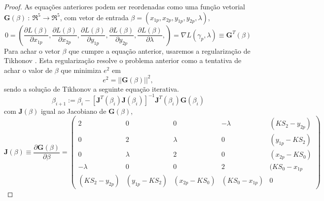 \documentclass[a4paper,10pt]{article}
\begin{document}
\begin{proof}
As equações anteriores podem ser reordenadas como uma função vetorial $\mathbf{G}(\beta)~:~{\Re}^5\rightarrow {\Re}^5$,
com vetor de entrada $\beta=(x_{1p},x_{2p},y_{1p},y_{2p},\lambda)$,
\begin{equation}\label{eq:tikon7}
 0 = \left(
  \frac{\partial L(\beta)}{\partial x_{1p}},
  \frac{\partial L(\beta)}{\partial x_{2p}},
  \frac{\partial L(\beta)}{\partial y_{1p}},
  \frac{\partial L(\beta)}{\partial y_{2p}},
  \frac{\partial L(\beta)}{\partial \lambda},  
 \right)
 =\nabla L(\gamma_p,\lambda) \equiv \mathbf{G}^T(\beta)
\end{equation}
Para achar o vetor $\beta$ que cumpre a equação anterior, usaremos a regularização de Tikhonov
 \cite{shobha2014newton,doicu2002iteratively,tichonov1992ill}. Esta regularização resolve o problema 
 anterior como  a tentativa de achar o valor de $\beta$ que minimiza $e^2$ em
\begin{equation}\label{eq:tikon8}
 e^2= ||\mathbf{G}(\beta)||^2,
\end{equation}
sendo a solução de Tikhonov a seguinte equação iterativa.
\begin{equation}\label{eq:tikon9}
 \beta_{i+1} := \beta_{i} - \left [ \mathbf{J}^T(\beta_i) \mathbf{J}(\beta_i) \right ]^{-1} \mathbf{J}^T(\beta_i) \mathbf{G}(\beta_i)
\end{equation} 
com $\mathbf{J}(\beta)$ igual ao Jacobiano de $\mathbf{G}(\beta)$,
\begin{equation}\label{eq:tikon10}
 \mathbf{J}(\beta)\equiv \frac{\partial \mathbf{G}(\beta)}{\partial \beta}=\left(
 \begin{matrix}
  2&0&0&-\lambda&(K S_2 - y_{2p})\\
  0&2&\lambda&0&(y_{1p}-K S_2)\\
  0&\lambda&2&0&(x_{2p}-K S_0)\\
  -\lambda&0&0&2&(K S_0 -x_{1p}\\
  (K S_2 - y_{2p})&(y_{1p}-K S_2)&(x_{2p}-K S_0)&(K S_0-x_{1p})&0
 \end{matrix}
 \right)
\end{equation}
\end{proof}
\end{document}
